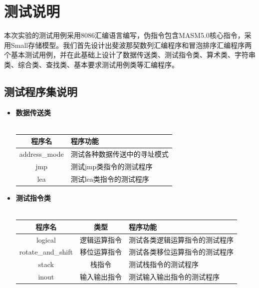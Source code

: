 \documentclass[UTF8,12pt]{article}
\begin{document}
	\section{测试说明}	
	    本次实验的测试用例采用8086汇编语言编写，伪指令包含MASM5.0核心指令，采用Small存储模型。我们首先设计出斐波那契数列汇编程序和冒泡排序汇编程序两个基本测试用例，并在此基础上设计了数据传送类、测试指令类、算术类、字符串类、综合类、查找类、基本要求测试用例类等汇编程序。
	    \subsection{测试程序集说明}
	    \begin{itemize}
	        \item \textbf{数据传送类} \\ \\
    	        \begin{tabular}{c|l}
    	            \hline
        	        程序名 & 程序功能 \\
        	        \hline
        	        address\_mode & 测试各种数据传送中的寻址模式 \\
        	        \hline
        	        jmp & 测试jmp类指令的测试程序 \\
        	        \hline
        	        lea & 测试lea类指令的测试程序 \\
        	        \hline
    	        \end{tabular}
	        
	        \item \textbf{测试指令类} \\ \\
	            \begin{tabular}{c|c|l}
	                \hline
	                程序名 & 类型 & 程序功能 \\
	                \hline
	                logical & 逻辑运算指令 & 测试各类逻辑运算指令的测试程序 \\
	                \hline
	                rotate\_and\_shift & 移位运算指令 & 测试各类移位运算指令的测试程序 \\
	                \hline
	                stack & 栈指令 & 测试栈指令的测试程序 \\
	                \hline
	                inout & 输入输出指令 & 测试输入输出指令的测试程序 \\ \hline
	            \end{tabular}
	            

\end{itemize}
\end{document}
